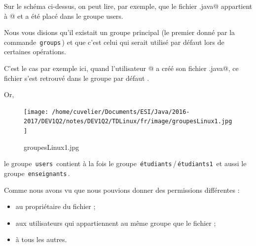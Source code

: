 \documentclass[11pt,a4paper]{article}
\begin{document}
          Sur le sch\'ema ci-dessus, on peut lire, par exemple, que le fichier \verb@Max.java@ 
          appartient \`a @ et a \'et\'e plac\'e dans le groupe users.
        
            \par
        
          Nous vous disions qu'il existait un groupe principal (le premier donn\'e par la commande \,\verb|groups|\,)
          et que c'est celui qui serait utilis\'e par d\'efaut lors de certaines op\'erations.
        
            \par
        
          C'est le cas par exemple ici,
          quand l'utilisateur @ a cr\'e\'e son fichier \verb@Max.java@,
          ce fichier s'est retrouv\'e dans le groupe par d\'efaut \verb@users@.
        
            \par
        
          Or, 
        
            \par
        \begin{figure}[hbt]
				    \begin{center}
					\texttt{[image: /home/cuvelier/Documents/ESI/Java/2016-2017/DEV1Q2/notes/DEV1Q2/TDLinux/fr/image/groupesLinux1.jpg]}
						\end{center}
                
                    \caption[groupesLinux1.jpg]{groupesLinux1.jpg}
                \end{figure}
                    
            \par
        
          le groupe \,\verb|users|\, contient \`a la fois 
          le groupe \,\verb|étudiants|\,/\,\verb|étudiants1|\, et
          aussi le groupe \,\verb|enseignants|\,.
        
            \par
        
					Comme nous avons vu que nous pouvions donner des permissions diff\'erentes :
					
					\begin{itemize}
				
			\item au propri\'etaire du fichier ;
			\item aux utilisateurs qui appartiennent au m\^eme groupe que le fichier ;
			\item  \`a tous les autres. 
					\end{itemize}
				
\end{document}
